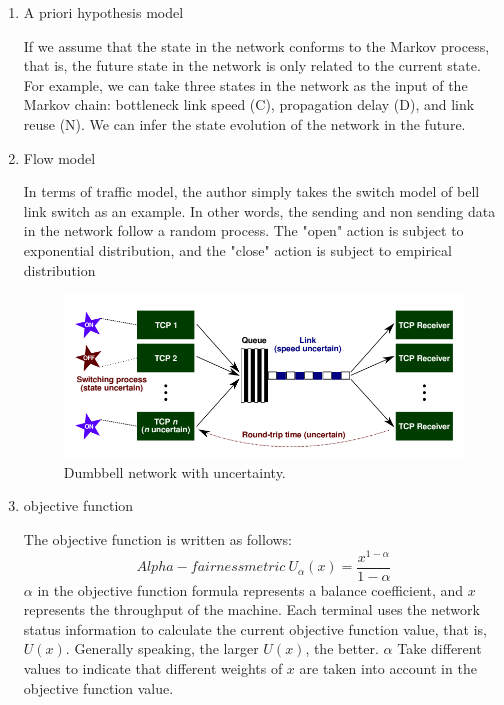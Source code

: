 \documentclass[conference]{IEEEtran}
\begin{document}
\begin{enumerate}
    \item A priori hypothesis model

    \quad If we assume that the state in the network conforms to the Markov process, that is, the future state in the network is only related to the current state. For example, we can take three states in the network as the input of the Markov chain: bottleneck link speed (C), propagation delay (D), and link reuse (N). We can infer the state evolution of the network in the future.
    \item Flow model

    \quad In terms of traffic model, the author simply takes the switch model of bell link switch as an example. In other words, the sending and non sending data in the network follow a random process. The "open" action is subject to exponential distribution, and the "close" action is subject to empirical distribution
    \begin{figure}[!h]
    \centerline{\includegraphics[scale=0.25]{picture/figure3-1.png}}
    \caption{Dumbbell network with uncertainty.\cite{a5}}
    \label{fig3-1}
    \end{figure}
    \item objective function

    \quad The objective function is written as follows:
    \begin{equation}
        Alpha-fairness metric\ U_\alpha(x)=\frac{x^{1-\alpha}}{1-\alpha}
    \end{equation}
    \quad $\alpha$ in the objective function formula represents a balance coefficient, and $x$ represents the throughput of the machine. Each terminal uses the network status information to calculate the current objective function value, that is, $U(x)$. Generally speaking, the larger $U(x)$, the better. $\alpha$ Take different values to indicate that different weights of $x$ are taken into account in the objective function value.


\end{enumerate}
\end{document}
